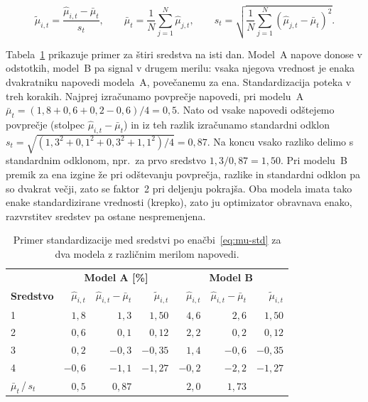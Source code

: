 \documentclass[9pt]{style/friteza}
\begin{document}
\begin{equation}
\label{eq:mu-std}
\tilde{\mu}_{i,t}
=
\frac{\hat{\mu}_{i,t}-\bar{\mu}_t}{s_t},
\qquad
\bar{\mu}_t=\frac{1}{N}\sum_{j=1}^{N}\hat{\mu}_{j,t},
\qquad
s_t=\sqrt{\frac{1}{N}\sum_{j=1}^{N}\left(\hat{\mu}_{j,t}-\bar{\mu}_t\right)^{2}}.
\end{equation}

Tabela~\ref{tab:std-example} prikazuje primer za štiri sredstva na isti dan. Model~A napove donose v odstotkih, model~B pa signal v drugem merilu: vsaka njegova vrednost je enaka dvakratniku napovedi modela~A, povečanemu za ena. Standardizacija poteka v treh korakih. Najprej izračunamo povprečje napovedi, pri modelu~A $\bar{\mu}_t=(1{,}8+0{,}6+0{,}2-0{,}6)/4=0{,}5$. Nato od vsake napovedi odštejemo povprečje (stolpec $\hat{\mu}_{i,t}-\bar{\mu}_t$) in iz teh razlik izračunamo standardni odklon $s_t=\sqrt{(1{,}3^2+0{,}1^2+0{,}3^2+1{,}1^2)/4}=0{,}87$. Na koncu vsako razliko delimo s standardnim odklonom, npr.\ za prvo sredstvo $1{,}3/0{,}87=1{,}50$. Pri modelu~B premik za ena izgine že pri odštevanju povprečja, razlike in standardni odklon pa so dvakrat večji, zato se faktor~2 pri deljenju pokrajša. Oba modela imata tako enake standardizirane vrednosti (krepko), zato ju optimizator obravnava enako, razvrstitev sredstev pa ostane nespremenjena.

\begin{table}[H]
\centering
\caption{Primer standardizacije med sredstvi po enačbi~\eqref{eq:mu-std} za dva modela z različnim merilom napovedi.}
\label{tab:std-example}
\sffamily\fontsize{7.5}{10}\selectfont %
\begin{tabular*}{\linewidth}{@{\extracolsep{\fill}}lrrrrrr}
\hline
 \rule[-3pt]{0pt}{12.5pt} & \multicolumn{3}{c}{\textbf{Model A [\%]}} & \multicolumn{3}{c}{\textbf{Model B}} \\
 \rule[-3pt]{0pt}{12.5pt}\textbf{Sredstvo} & $\hat{\mu}_{i,t}$ & $\hat{\mu}_{i,t}-\bar{\mu}_t$ & $\tilde{\mu}_{i,t}$ & $\hat{\mu}_{i,t}$ & $\hat{\mu}_{i,t}-\bar{\mu}_t$ & $\tilde{\mu}_{i,t}$ \\
\hline
1 & $1{,}8$ & $1{,}3$ & {\boldmath$1{,}50$} & $4{,}6$ & $2{,}6$ & {\boldmath$1{,}50$} \\
2 & $0{,}6$ & $0{,}1$ & {\boldmath$0{,}12$} & $2{,}2$ & $0{,}2$ & {\boldmath$0{,}12$} \\
3 & $0{,}2$ & $-0{,}3$ & {\boldmath$-0{,}35$} & $1{,}4$ & $-0{,}6$ & {\boldmath$-0{,}35$} \\
4 & $-0{,}6$ & $-1{,}1$ & {\boldmath$-1{,}27$} & $-0{,}2$ & $-2{,}2$ & {\boldmath$-1{,}27$} \\
\hline
 \rule[-3pt]{0pt}{12.5pt}$\bar{\mu}_t$\,/\,$s_t$ & $0{,}5$ & $0{,}87$ & & $2{,}0$ & $1{,}73$ & \\
\hline
\end{tabular*}
\end{table}
\end{document}
